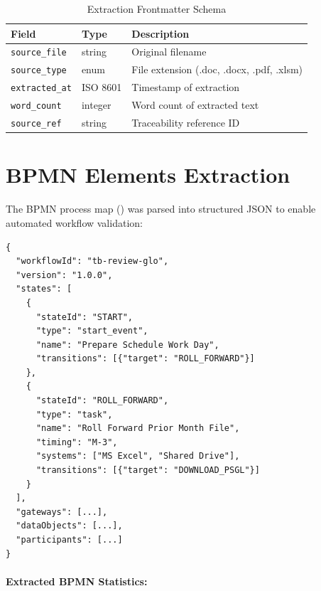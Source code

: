 \begin{table}[h]
\centering
\caption{Extraction Frontmatter Schema}
\label{tab:frontmatter-schema}
\begin{tabularx}{\textwidth}{@{}L{3cm}C{2cm}L{8.5cm}@{}}
\toprule
\textbf{Field} & \textbf{Type} & \textbf{Description} \\
\midrule
\texttt{source\_file} & string & Original filename \\
\texttt{source\_type} & enum & File extension (.doc, .docx, .pdf, .xlsm) \\
\texttt{extracted\_at} & ISO 8601 & Timestamp of extraction \\
\texttt{word\_count} & integer & Word count of extracted text \\
\texttt{source\_ref} & string & Traceability reference ID \\
\bottomrule
\end{tabularx}
\end{table}

\section{BPMN Elements Extraction}
\label{sec:bpmn-extraction}

The BPMN process map () was parsed into structured
JSON to enable automated workflow validation:

\begin{lstlisting}[language=jsonx,caption=BPMN Elements Structure]
{
  "workflowId": "tb-review-glo",
  "version": "1.0.0",
  "states": [
    {
      "stateId": "START",
      "type": "start_event",
      "name": "Prepare Schedule Work Day",
      "transitions": [{"target": "ROLL_FORWARD"}]
    },
    {
      "stateId": "ROLL_FORWARD",
      "type": "task",
      "name": "Roll Forward Prior Month File",
      "timing": "M-3",
      "systems": ["MS Excel", "Shared Drive"],
      "transitions": [{"target": "DOWNLOAD_PSGL"}]
    }
  ],
  "gateways": [...],
  "dataObjects": [...],
  "participants": [...]
}
\end{lstlisting}

\paragraph{Extracted BPMN Statistics:}

